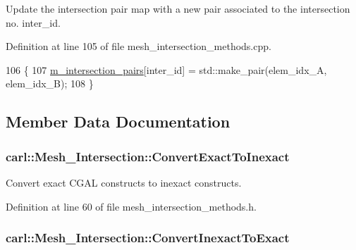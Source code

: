 Update the intersection pair map with a new pair associated to the intersection no. inter\+\_\+id. 



Definition at line 105 of file mesh\+\_\+intersection\+\_\+methods.\+cpp.


\begin{DoxyCode}
106 \{
107     \hyperlink{classcarl_1_1_mesh___intersection_a06a4d0d633bf58594fee6e35ebbc1b97}{m\_intersection\_pairs}[inter\_id] = std::make\_pair(elem\_idx\_A, elem\_idx\_B);
108 \}
\end{DoxyCode}


\subsection{Member Data Documentation}
\hypertarget{classcarl_1_1_mesh___intersection_ac80b6a1094d5268d646150d1f5e61560}{}
\subsubsection[{Convert\+Exact\+To\+Inexact}]{ carl\+::\+Mesh\+\_\+\+Intersection\+::\+Convert\+Exact\+To\+Inexact\hspace{0.3cm}{\ttfamily [protected]}}\label{classcarl_1_1_mesh___intersection_ac80b6a1094d5268d646150d1f5e61560}


Convert exact C\+G\+A\+L constructs to inexact constructs. 



Definition at line 60 of file mesh\+\_\+intersection\+\_\+methods.\+h.

\hypertarget{classcarl_1_1_mesh___intersection_a9b682296131536eb588bcee3d7f253b1}{}
\subsubsection[{Convert\+Inexact\+To\+Exact}]{ carl\+::\+Mesh\+\_\+\+Intersection\+::\+Convert\+Inexact\+To\+Exact\hspace{0.3cm}{\ttfamily [protected]}}\label{classcarl_1_1_mesh___intersection_a9b682296131536eb588bcee3d7f253b1}


